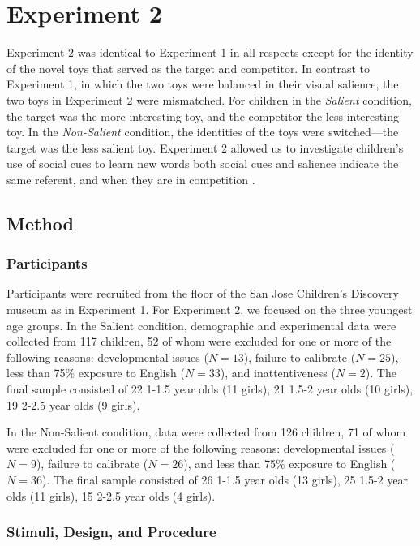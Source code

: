 \documentclass[man,floatsintext]{apa6}
\begin{document}
\section{Experiment 2}

Experiment 2 was identical to Experiment 1 in all respects except for the identity of the novel toys that served as the target and competitor. In contrast to Experiment 1, in which the two toys were balanced in their visual salience, the two toys in Experiment 2 were mismatched. For children in the \emph{Salient} condition, the target was the more interesting toy, and the competitor the less interesting toy. In the \emph{Non-Salient} condition, the identities of the toys were switched---the target was the less salient toy. Experiment 2 allowed us to investigate children's use of social cues to learn new words both social cues and salience indicate the same referent, and when they are in competition \cite<as in>{Hollich2000,Pruden2006}.

\subsection{Method}

\subsubsection{Participants}

Participants were recruited from the floor of the San Jose Children's Discovery museum as in Experiment 1. For Experiment 2, we focused on the three youngest age groups. In the Salient condition, demographic and experimental data were collected from 117 children, 52 of whom were excluded for one or more of the following reasons: developmental issues ($N= 13$), failure to calibrate ($N=25$), less than 75\% exposure to English ($N=33$), and inattentiveness ($N=2$). The final sample consisted of 22 1-1.5 year olds (11 girls), 21 1.5-2 year olds (10 girls), 19 2-2.5 year olds (9 girls). 

In the Non-Salient condition, data were collected from 126 children, 71 of whom were excluded for one or more of the following reasons: developmental issues ($N= 9$), failure to calibrate ($N=26$), and less than 75\% exposure to English ($N=36$). The final sample consisted of 26 1-1.5 year olds (13 girls), 25 1.5-2 year olds (11 girls), 15 2-2.5 year olds (4 girls).

\subsubsection{Stimuli, Design, and Procedure}
\end{document}

